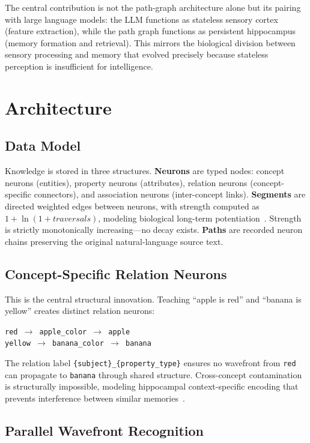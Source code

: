 \documentclass[runningheads]{llncs}
\begin{document}
The central contribution is not the path-graph architecture alone but its pairing with large language models: the LLM functions as stateless sensory cortex (feature extraction), while the path graph functions as persistent hippocampus (memory formation and retrieval). This mirrors the biological division between sensory processing and memory that evolved precisely because stateless perception is insufficient for intelligence.

\section{Architecture}

\subsection{Data Model}

Knowledge is stored in three structures. \textbf{Neurons} are typed nodes: concept neurons (entities), property neurons (attributes), relation neurons (concept-specific connectors), and association neurons (inter-concept links). \textbf{Segments} are directed weighted edges between neurons, with strength computed as $1 + \ln(1 + \textit{traversals})$, modeling biological long-term potentiation~\cite{bliss1973}. Strength is strictly monotonically increasing---no decay exists. \textbf{Paths} are recorded neuron chains preserving the original natural-language source text.

\subsection{Concept-Specific Relation Neurons}

This is the central structural innovation. Teaching ``apple is red'' and ``banana is yellow'' creates distinct relation neurons:

\smallskip
\noindent\texttt{red $\rightarrow$ apple\_color $\rightarrow$ apple}\\
\texttt{yellow $\rightarrow$ banana\_color $\rightarrow$ banana}
\smallskip

\noindent The relation label \texttt{\{subject\}\_\{property\_type\}} ensures no wavefront from \texttt{red} can propagate to \texttt{banana} through shared structure. Cross-concept contamination is structurally impossible, modeling hippocampal context-specific encoding that prevents interference between similar memories~\cite{yassa2011}.

\subsection{Parallel Wavefront Recognition}
\end{document}
